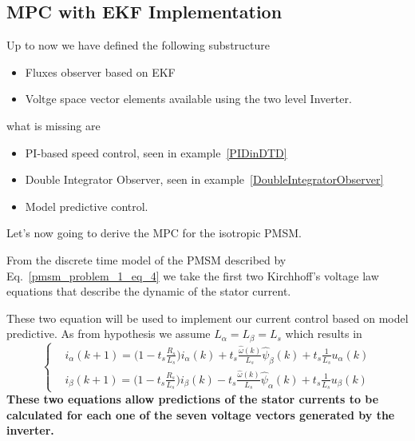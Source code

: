 \documentclass[12pt,a4paper,oneside]{book}
\begin{document}
\begin{onehalfspace}
\subsection{MPC with EKF Implementation}
Up to now we have defined the following substructure
\begin{itemize}
	\item[--] Fluxes observer based on EKF 
	\item[--] Voltge space vector elements available using the two level Inverter.
\end{itemize}
what is missing are 
\begin{itemize}
	\item[--] PI-based speed control, seen in example~\ref{PIDinDTD}
	\item[--] Double Integrator Observer, seen in example~\ref{DoubleIntegratorObserver}
	\item[--] Model predictive control.
\end{itemize}
Let's now going to derive the MPC for the isotropic PMSM.

From the discrete time model of the PMSM described by Eq.~\eqref{pmsm_problem_1_eq_4} we take the first two Kirchhoff's voltage law equations that describe the dynamic of the stator current. 

These two equation will be used to implement our current control based on model predictive. As from hypothesis we assume $L_\alpha=L_\beta=L_s$ which results in
\begin{equation}\label{pmsm_problem_1_eq_22}
	\left\lbrace \begin{aligned}
		&i_\alpha(k+1)=\Big(1-t_s\frac{R_s}{L_s}\Big)i_\alpha(k) + 
		t_s\frac{\hat{\omega}(k)}{L_s}\hat{\psi}_\beta(k) + 
		t_s\frac{1}{L_s}u_\alpha(k) \\[6pt] 
		&i_\beta(k+1)=\Big(1-t_s\frac{R_s}{L_s}\Big)i_\beta(k) - 
		t_s\frac{\hat{\omega}(k)}{L_s}\hat{\psi}_\alpha(k) + 
		t_s\frac{1}{L_s}u_\beta(k)
	\end{aligned}\right. 
\end{equation}
\textbf{These two equations allow predictions of the stator currents to be calculated for 
	each one of the seven voltage vectors generated by the inverter.}


\end{onehalfspace}
\end{document}
